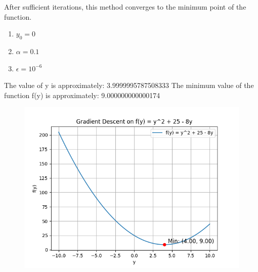 \documentclass[journal]{IEEEtran}
\begin{document}
After sufficient iterations, this method converges to the minimum point of the function.\\
\begin{enumerate}
    \item {} $ y_0 = 0 $
    \item {} $ \alpha = 0.1 $
    \item {} $ \epsilon = 10^{-6} $
\end{enumerate}
The value of y is approximately: 3.9999995787508333
The minimum value of the function f(y) is approximately: 9.000000000000174
\begin{figure}[h!]
   \centering
   \includegraphics[width=\columnwidth]{figs/6.5.27.png}
   \caption{}
   \label{}
\end{figure}
\end{document}
